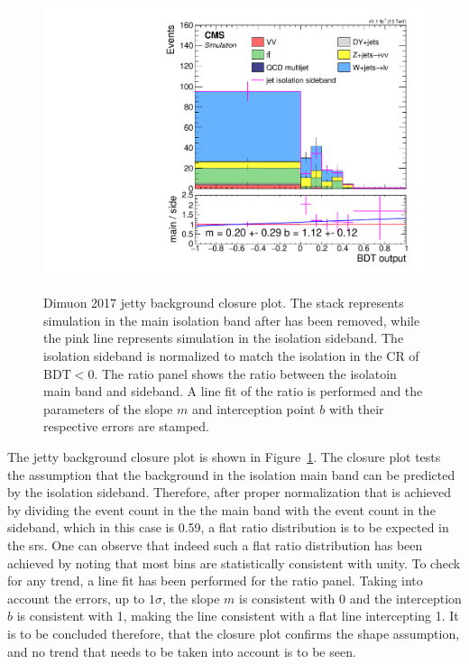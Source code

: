\begin{figure}[!htb]
\centering
\includegraphics[width=0.60\linewidth]{plots/dilepton_muons_2017_closure/none_closure_dilepBDTphase1CorrJetNoMultIso10Dr0.6.pdf}  \\


\caption[Dimuon 2017 jetty background closure plot]{Dimuon 2017 jetty background closure plot. The stack represents simulation in the main isolation band after \ztautau has been removed, while the pink line represents simulation in the isolation sideband. The isolation sideband is normalized to match the isolation in the CR of $\mathrm{BDT} < 0$. The ratio panel shows the ratio between the isolatoin main band and sideband. A line fit of the ratio is performed and the parameters of the slope $m$ and interception point $b$ with their respective errors are stamped.}
\label{fig:dimuon-bdt-jetty-2017-closure}
\end{figure}

The jetty background closure plot is shown in Figure~\ref{fig:dimuon-bdt-jetty-2017-closure}. The closure plot tests the assumption that the background in the isolation main band can be predicted by the isolation sideband. Therefore, after proper normalization that is achieved by dividing the event count in the the main band with the event count in the sideband, which in this case is 0.59, a flat ratio distribution is to be expected in the \glspl{sr}. One can observe that indeed such a flat ratio distribution has been achieved by noting that most bins are statistically consistent with unity. To check for any trend, a line fit has been performed for the ratio panel. Taking into account the errors, up to $1\sigma$, the slope $m$ is consistent with 0 and the interception $b$ is consistent with 1, making the line consistent with a flat line intercepting 1. It is to be concluded therefore, that the closure plot confirms the shape assumption, and no trend that needs to be taken into account is to be seen. 

